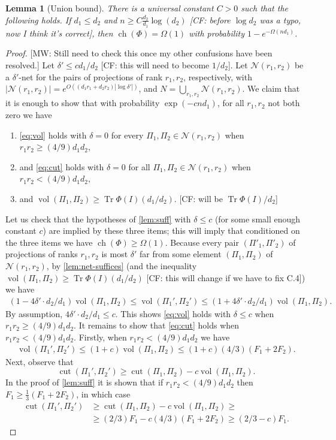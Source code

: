 \documentclass[aos]{imsart}
\newtheorem{lemma}[theorem]{Lemma}
\theoremstyle{definition}
\numberwithin{equation}{section}
\DeclareMathOperator{\vol}{vol}
\DeclareMathOperator{\cut}{cut}
\DeclareMathOperator{\ch}{ch}
\DeclareMathOperator{\tr}{Tr}
\newcommand{\cN}{\mathcal{N}}
\newcommand{\CF}[1]{{\color{purple}[CF: #1]}}
\newcommand{\MW}[1]{{\color{red}[MW: #1]}}
\newcommand{\CF}[1]{{}}
\newcommand{\MW}[1]{{}}
\begin{document}
\begin{appendix}
\begin{lemma}[Union bound]\label{lem:union}
There is a universal constant $C>0$ such that the following holds.
If $d_1 \leq d_2$ and $n \geq C \frac{d_2}{d_1} \log (d_2)$ \CF{before $\log d_2$ was a typo, now I think it's correct}, then $\ch(\Phi) = \Omega(1)$ with probability $1 - e^{- \Omega(n d_1)}$.
\end{lemma}
\begin{proof}
\MW{Still need to check this once my other confusions have been resolved.}
Let $\delta' \leq c d_1/d_2$ \CF{this will need to become $1/d_2$}. Let $\cN(r_1, r_2)$ be a $\delta'$-net for the pairs of projections of rank $r_1, r_2$, respectively, with $|\cN(r_1, r_2)| = e^{O((d_1r_1 + d_2 r_2) |\log \delta'|)}$, and $N = \bigcup_{r_1, r_2} \cN(r_1, r_2)$. We claim that it is enough to show that with probability $\exp( - c n d_1 )$, for all $r_1, r_2$ not both zero we have
\begin{enumerate}
\item \cref{eq:vol} holds with $\delta = 0$ for every $\Pi_1,\Pi_2 \in \cN(r_1, r_2)$ when $r_1 r_2 \geq (4/9) d_1 d_2$,
\item  and \cref{eq:cut} holds with $\delta =0$ for all $\Pi_1, \Pi_2 \in \cN(r_1, r_2)$ when $r_1 r_2 < (4/9) d_1 d_2$,
\item and $\vol(\Pi_1, \Pi_2) \geq \tr \Phi(I) (d_1/d_2)$. \CF{will be $\tr \Phi(I) /d_2$}
\end{enumerate}
Let us check that the hypotheses of \cref{lem:suff} with $\delta \leq c$ (for some small enough constant $c$) are implied by these three items; this will imply that conditioned on the three items we have $\ch(\Phi) \geq \Omega(1)$. Because every pair $(\Pi'_1,\Pi'_2)$ of projections of ranks $r_1,r_2$ is most $\delta'$ far from some element $(\Pi_1, \Pi_2)$ of $\cN(r_1,r_2)$, by \cref{lem:net-suffices} (and the inequality $\vol(\Pi_1, \Pi_2) \geq \tr \Phi(I)(d_1/d_2)$ \CF{this will change if we have to fix C.4}) we have
\begin{align*} (1 - 4 \delta'  \cdot d_2/d_1) \vol(\Pi_1, \Pi_2) \leq  \vol(\Pi_1', \Pi_2') \leq  (1 + 4 \delta'  \cdot d_2/d_1) \vol(\Pi_1, \Pi_2).\end{align*}
By assumption, $4 \delta' \cdot d_2/d_1 \leq c$. This shows \cref{eq:vol} holds with $\delta \leq c$ when $r_1 r_2 \geq (4/9) d_1 d_2$. It remains to show that \cref{eq:cut} holds when $r_1 r_2 < (4/9) d_1 d_2$. Firstly, when $r_1 r_2 < (4/9) d_1 d_2$ we have
\begin{gather} \vol(\Pi_1', \Pi_2') \leq (1 + c) \vol(\Pi_1, \Pi_2) \leq  (1 + c)(4/3)(F_1 + 2 F_2).\label{eq:not-net-9a}\end{gather}
  Next, observe that
$$  \cut(\Pi_1', \Pi_2') \geq \cut(\Pi_1, \Pi_2) - c \vol(\Pi_1, \Pi_2).$$
In the proof of \cref{lem:suff} it is shown that if $r_1 r_2 < (4/9) d_1 d_2$ then $F_1 \geq \frac{1}{3} (F_1 + 2 F_2)$, in which case
\begin{align}
\cut(\Pi_1', \Pi_2') &\geq \cut(\Pi_1, \Pi_2) - c \vol(\Pi_1, \Pi_2) \geq \nonumber\\
& \geq (2/3) F_1 -  c (4/3)(F_1 + 2 F_2) \geq (2/3 - c) F_1.\label{eq:not-net-9b}
\end{align}


\end{proof}
\end{appendix}
\end{document}
